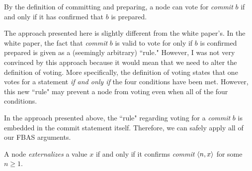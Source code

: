 \begin{rem}
    By the definition of committing and preparing, a node can vote for \textit{commit} $b$ if and only if it has confirmed that $b$ is prepared.
\end{rem}

\begin{rem}
    The approach presented here is slightly different from the white paper's.
    In the white paper, the fact that \textit{commit} $b$ is valid to vote for only if $b$ is confirmed prepared is given as a (seemingly arbitrary) ``rule."
    However, I was not very convinced by this approach because it would mean that we need to alter the definition of voting.
    More specifically, the definition of voting states that one votes for a statement \textit{if and only if} the four conditions have been met.  
    However, this new ``rule" may prevent a node from voting even when all of the four conditions.

    In the approach presented above, the ``rule" regarding voting for a \textit{commit} $b$ is embedded in the commit statement itself.
    Therefore, we can safely apply all of our FBAS arguments.
\end{rem}

\begin{defn}[Externalize]
    A node \textit{externalizes} a value $x$ if and only if it confirms \textit{commit} $\ev{n, x}$ for some $n \geq 1$.
\end{defn}

